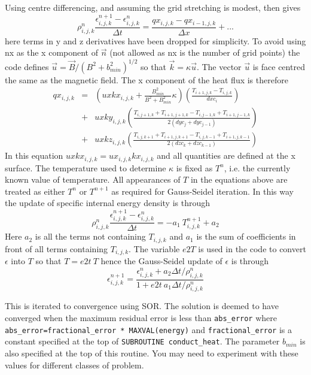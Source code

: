 \documentclass[11pt]{article}
\begin{document}
Using centre differencing, and assuming the grid stretching is modest,  then gives
\[
\rho_{i,j,k}^n \frac{\epsilon_{i,j,k}^{n+1}- \epsilon_{i,j,k}^{n}}{\Delta t}  =  
\frac{qx_{i,j,k}- qx_{i-1,j,k}}{\Delta x} + ...
\]      
here terms in y and z derivatives have been dropped for simplicity. To avoid using nx as the x component of $\vec{n}$ (not allowed as nx is the number of grid points) the code defines $\vec{u}=\vec{B}/(B^2+b_{min}^2)^{1/2}$ so that $\vec{k} = \kappa \vec{u}$. The vector $\vec{u}$ is face centred the same as the magnetic field. The x component of the heat flux is therefore
\begin{eqnarray*}
qx_{i,j,k}&=&\left(uxkx_{i,j,k} + \frac{B_{min}^2}{B^2+B_{min}^2}\kappa \right)\left(\frac{T_{i+1,j,k}-T_{i,j,k}}{dxc_i} 
    \right) \\
    &+& uxky_{i,j,k}\left(\frac{T_{i,j+1,k}+T_{i+1,j+1,k}-T_{i,j-1,k}+T_{i+1,j-1,k}}{2(dyc_j+dyc_{j-1})} \right) \\
    &+& uxkz_{i,j,k}\left(\frac{T_{i,j,k+1}+T_{i+1,j,k+1}-T_{i,j,k-1}+T_{i+1,j,k-1}}{2(dzc_k+dzc_{k-1})} \right)
\end{eqnarray*}
In this equation $uxkx_{i,j,k}=ux_{i,j,k}kx_{i,j,k}$ and all quantities are defined at the x surface. The temperature used to determine $\kappa$ is fixed as $T^n$, i.e. the currently known value of temperature. All appearances of $T$ in the equations above are treated as either $T^n$ or $T^{n+1}$ as required for Gauss-Seidel iteration. In this way the update of specific internal energy density is through
\[
\rho_{i,j,k}^n \frac{\epsilon_{i,j,k}^{n+1}- \epsilon_{i,j,k}^{n}}{\Delta t}  =  - a_1\ T_{i,j,k}^{n+1} + a_2
\]
Here $a_2$ is all the terms not containing $T_{i,j,k}$ and $a_1$ is the sum of coefficients in front of all terms containing 
$T_{i,j,k}$.
The variable $e2T$ is used in the code to convert $\epsilon$ into $T$ so that $T=e2t \ T$ hence the Gauss-Seidel update of $\epsilon$ is through
\[
\epsilon_{i,j,k}^{n+1}=\frac{\epsilon_{i,j,k}^{n} + a_2 \Delta t /\rho_{i,j,k}^n}{1+e2t\ a_1 \Delta t /\rho_{i,j,k}^n}
\]

This is iterated to convergence using SOR. The solution is deemed to have converged when the maximum residual error is less than \texttt{abs\_error} where \texttt{abs\_error=fractional\_error * MAXVAL(energy)} and \texttt{fractional\_error} is a constant specified at the top of {\tt SUBROUTINE conduct\_heat}. The parameter $b_{min}$ is also specified at the top of this routine. You may need to experiment with these values for different classes of problem.
\end{document}
